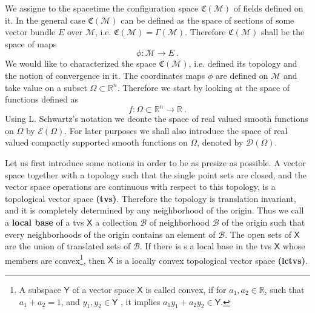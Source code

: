 \documentclass[10pt]{book}
\newcommand{\Bcal}{\mathcal{B}}
\newcommand{\Dcal}{\mathcal{D}}
\newcommand{\Ecal}{\mathcal{E}}
\newcommand{\Mcal}{\mathcal{M}}
\newcommand{\Rbb}{\mathbb{R}}
\newcommand{\Crak}{\mathfrak{C}}
\newcommand{\Xsf}{\mathsf{X}}
\newcommand{\Ysf}{\mathsf{Y}}
\theoremstyle{break}
\begin{document}
We assigne to the spacetime the configuration space $\Crak(\Mcal)$ of fields defined on it. In the general case $\Crak(\Mcal)$ can be defined as the space of sections of some vector bundle $E$ over $\Mcal$, i.e. $\Crak(\Mcal) = \Gamma(\Mcal)$. Therefore $\Crak(\Mcal)$ shall be the space of maps 
%
\begin{equation*}
\phi : \Mcal \to E \ . 
\end{equation*}
%
We would like to characterized the space $\Crak(\Mcal)$, i.e. defined its topology and the notion of convergence in it. The coordinates maps $\phi$ are defined on $\Mcal$ and take value on a subset $\Omega \subset \Rbb^n$. Therefore we start by looking at the space of functions defined as 
%
\begin{equation*}
f : \Omega \subset \Rbb^n \to \Rbb \ . 
\end{equation*}
%
Using L. Schwartz's notation we deonte the space of real valued smooth functions on $\Omega$ by $\Ecal(\Omega)$. For later purposes we shall also introduce the space of real valued compactly supported smooth functions on $\Omega$, denoted by $\Dcal(\Omega)$.


\bigskip


Let us first introduce some notions in order to be as presize as possible. A vector space together with a topology such that the single point sets are closed, and the vector space operations are continuous with respect to this topology, is a topological vector space \textbf{(tvs)}. Therefore the topology is translation invariant, and it is completely determined by any neighborhood of the origin. Thus we call a \textbf{local base} of a tvs $\Xsf$ a collection $\Bcal$ of neighborhood $\Bcal$ of the origin such that every neighborhoods of the origin contains an element of $\Bcal$. The open sets of $\Xsf$ are the union of translated sets of $\Bcal$. If there is s a local base in the tvs $\Xsf$ whose members are convex\footnote{A subspace $\Ysf$ of a vector space $\Xsf$ is called convex, if for $a_1, a_2 \in \Rbb$, such that $a_1 + a_2 = 1$, and $y_1, y_2 \in \Ysf$ , it implies $a_1 y_1 + a_2 y_2 \in \Ysf$.}, then $\Xsf$ is a locally convex topological vector space \textbf{(lctvs)}.

\bigskip
\end{document}
